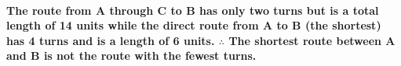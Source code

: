 \paragraph{{\color{answer}{}The route from A through C to B has only two turns but is a total length of 14 units while the direct route from A to B (the shortest) has 4 turns and is a length of 6 units. $\therefore$ The shortest route between A and B is not the route with the fewest turns. }}

